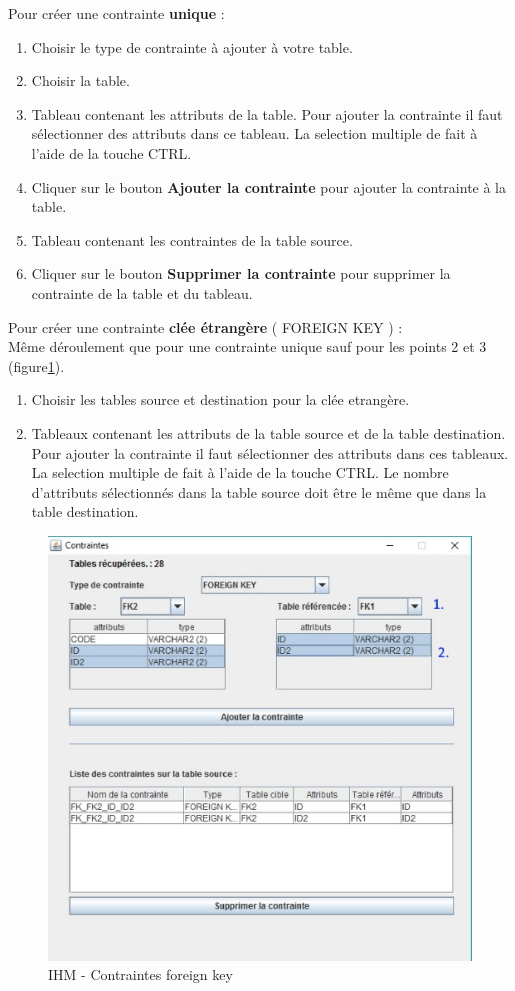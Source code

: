 Pour créer une contrainte \textbf{unique} :
\begin{enumerate}
\item Choisir le type de contrainte à ajouter à votre table.
\item Choisir la table.
\item Tableau contenant les attributs de la table. Pour ajouter la contrainte il faut sélectionner des attributs dans ce tableau. La selection multiple de fait à l'aide de la touche CTRL.
\item Cliquer sur le bouton \textbf{Ajouter la contrainte} pour ajouter la contrainte à la table.
\item Tableau contenant les contraintes de la table source.
\item Cliquer sur le bouton \textbf{Supprimer la contrainte} pour supprimer la contrainte de la table et du tableau.
\end{enumerate}

Pour créer une contrainte \textbf{clée étrangère} ( FOREIGN KEY ) :\\
Même déroulement que pour une contrainte unique sauf pour les points 2 et 3 (figure\ref{contraintes_fk_gui}).

\begin{enumerate}
\item Choisir les tables source et destination pour la clée etrangère.
\item Tableaux contenant les attributs de la table source et de la table destination. Pour ajouter la contrainte il faut sélectionner des attributs dans ces tableaux. La selection multiple de fait à l'aide de la touche CTRL. Le nombre d'attributs sélectionnés dans la table source doit être le même que dans la table destination.
\end{enumerate}

\begin{figure}[!h]
\centering
\includegraphics[width=12cm]{./images/manuel/contraintes_fk.eps}
\caption{IHM - Contraintes foreign key}
\label{contraintes_fk_gui}
\end{figure}


